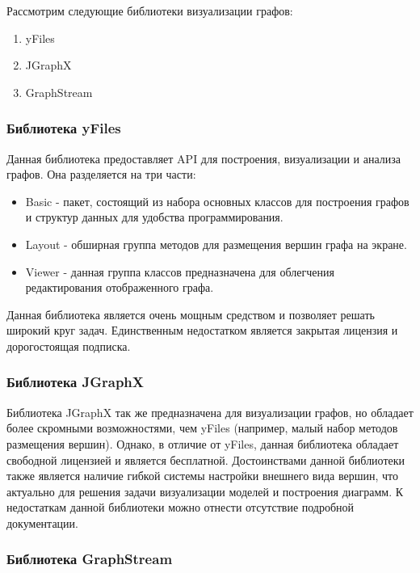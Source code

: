 Рассмотрим следующие библиотеки визуализации графов:

\begin{enumerate}
    \item yFiles
    \item JGraphX
    \item GraphStream
\end{enumerate}

\subsubsection{Библиотека yFiles}

Данная библиотека предоставляет API для построения, визуализации и анализа
графов. Она разделяется на три части:

\begin{itemize}
    \item Basic - пакет, состоящий из набора основных классов для построения
    графов и структур данных для удобства программирования.
    \item Layout - обширная группа методов для размещения вершин графа на
    экране.
    \item Viewer - данная группа классов предназначена для облегчения
    редактирования отображенного графа.
\end{itemize}

Данная библиотека является очень мощным средством и позволяет решать широкий
круг задач. Единственным недостатком является закрытая лицензия и дорогостоящая
подписка.

\subsubsection{Библиотека JGraphX}

Библиотека JGraphX так же предназначена для визуализации графов, но обладает
более скромными возможностями, чем yFiles (например, малый набор методов
размещения вершин). Однако, в отличие от yFiles, данная библиотека обладает
свободной лицензией и является бесплатной. Достоинствами данной библиотеки также
является наличие гибкой системы настройки внешнего вида вершин, что актуально
для решения задачи визуализации моделей и построения диаграмм. К недостаткам
данной библиотеки можно отнести отсутствие подробной документации.

\subsubsection{Библиотека GraphStream}

